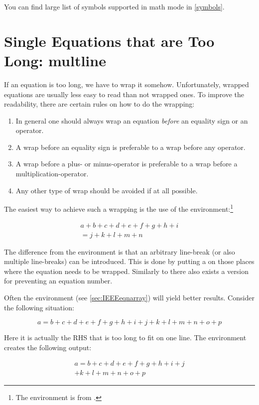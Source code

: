 You can find large list of symbols supported in math mode in
\autoref{symbols}.

\section{Single Equations that are Too Long: multline}%
\label{sec:multline}

If an equation is too long, we have to wrap it somehow. Unfortunately,
wrapped equations are usually less easy to read than not wrapped
ones. To improve the readability, there are certain rules on how to do
the wrapping:
\begin{enumerate}
  \item In general one should always wrap an equation \emph{before} an
        equality sign or an operator.
  \item A wrap before an equality sign is preferable to a wrap before
        any operator.
  \item A wrap before a plus- or minus-operator is preferable to a wrap
        before a multiplication-operator.
  \item Any other type of wrap should be avoided if at all possible.
\end{enumerate}
The easiest way to achieve such a wrapping is the use of the
 en\-vi\-ron\-ment:\footnote{The
   environment is from .}
\begin{example}
\begin{multline}
  a + b + c + d + e + f 
  + g + h + i  
  \\
  = j + k + l + m + n 
\end{multline}
\end{example}
\noindent
The difference from the  environment is that an arbitrary
line-break (or also multiple line-breaks) can be introduced. This is
done by putting a \csi{\bs} on those places where the equation needs
to be wrapped. Similarly to  there also exists a
 version for preventing an equation number.

Often the
 environment (see \autoref{sec:IEEEeqnarray})
will yield better results.  Consider the following
situation:
\begin{example}
\begin{equation}
  a = b + c + d + e + f 
  + g + h + i + j 
  + k + l + m + n + o + p  
  \label{eq:equation_too_long}
\end{equation}
\end{example}
\noindent
Here it is actually the RHS that is too long to fit on one line. The
 environment creates the following output:
\begin{example}
\begin{multline}
  a = b + c + d + e + f 
  + g + h + i + j \\
  + k + l + m + n + o + p
\end{multline}
\end{example}


